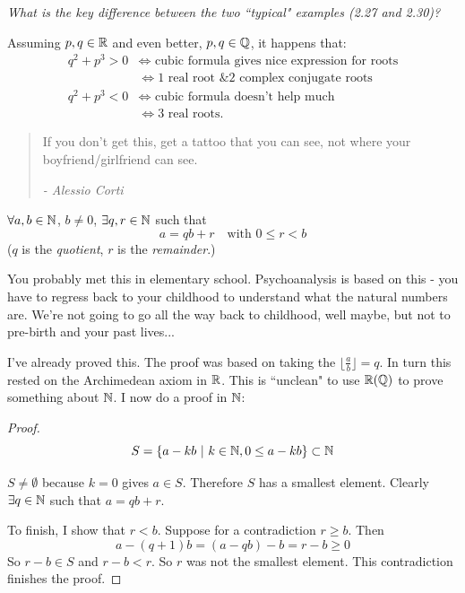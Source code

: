 \documentclass[10pt]{scrartcl}
\begin{document}
\emph{What is the key difference between the two ``typical" examples (2.27 and 2.30)? }

Assuming $p, q\in\mathbb{R}$ and even better, $p, q \in\mathbb{Q}$, it happens that: 
\[
\begin{aligned}
  q^2 + p^3 > 0 &\iff \text{ cubic formula gives nice expression for roots}\\
  &\iff 1 \mbox{ real root \& $2$ complex conjugate roots}\\[0.2cm]
  q^2 + p^3 < 0&\iff \mbox{ cubic formula doesn't help much}\\
  &\iff 3 \text{ real roots.} 
\end{aligned}
\]






\begin{quote}
If you don't get this, get a tattoo that you can see, not where your boyfriend/girlfriend can see.  
\begin{flushright}
      \textit{ -  Alessio Corti}
       \end{flushright} 
\end{quote} 


\vspace*{5pt}

\begin{theorem} 
$\forall a,b \in\mathbb{N}$, $b \neq 0$, $\exists q, r\in\mathbb{N}$ such that 
\[a = qb + r \quad \text{with } 0 \leq r < b\]	
($q$ is the \emph{quotient}, $r$ is the \emph{remainder}.)
\end{theorem}\vspace*{5pt}


You probably met this in elementary school. Psychoanalysis is based on this - you have to regress back to your childhood to understand what the natural numbers are. We're not going to go all the way back to childhood, well maybe, but not to pre-birth and your past lives...\\

\begin{remark}
I've already proved this. The proof was based on taking the $\lfloor \frac{a}{b}\rfloor = q$. In turn this rested on the Archimedean axiom in $\mathbb{R}$. This is ``unclean" to use $\mathbb{R} (\mathbb{Q})$ to prove something about $\mathbb{N}$. I now do a proof in $\mathbb{N}$: 	
\end{remark}

\begin{proof}
\[S = \{a - kb ~|~ k \in\mathbb{N}, 0 \leq a - kb \} \subset \mathbb{N}\]	

$S \neq \emptyset$ because $k = 0$ gives $a \in S$. Therefore $S$ has a smallest element. Clearly $\exists q \in\mathbb{N}$ such that $a = qb + r$. 

To finish, I show that $r < b$. Suppose for a contradiction $ r \geq b$. Then 
\[a - (q+1)b = (a-qb)- b = r-b \geq 0\]
So $r-b \in S$ and $r-b < r$. So $r$ was not the smallest element. This contradiction finishes the proof.
\end{proof}
\end{document}
